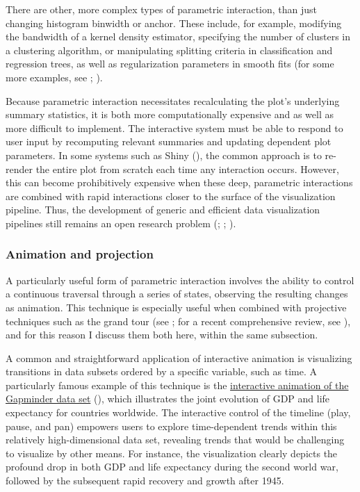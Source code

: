 \documentclass[
]{book}
\theoremstyle{definition}
\theoremstyle{definition}
\theoremstyle{definition}
\theoremstyle{definition}
\theoremstyle{remark}
\begin{document}
There are other, more complex types of parametric interaction, than just changing histogram binwidth or anchor. These include, for example, modifying the bandwidth of a kernel density estimator, specifying the number of clusters in a clustering algorithm, or manipulating splitting criteria in classification and regression trees, as well as regularization parameters in smooth fits (for some more examples, see ; ).

Because parametric interaction necessitates recalculating the plot's underlying summary statistics, it is both more computationally expensive and as well as more difficult to implement. The interactive system must be able to respond to user input by recomputing relevant summaries and updating dependent plot parameters. In some systems such as Shiny (), the common approach is to re-render the entire plot from scratch each time any interaction occurs. However, this can become prohibitively expensive when these deep, parametric interactions are combined with rapid interactions closer to the surface of the visualization pipeline. Thus, the development of generic and efficient data visualization pipelines still remains an open research problem (; ; ).

\subsubsection{Animation and projection}\label{animation-and-projection}

A particularly useful form of parametric interaction involves the ability to control a continuous traversal through a series of states, observing the resulting changes as animation. This technique is especially useful when combined with projective techniques such as the grand tour (see ; for a recent comprehensive review, see ), and for this reason I discuss them both here, within the same subsection.

A common and straightforward application of interactive animation is visualizing transitions in data subsets ordered by a specific variable, such as time. A particularly famous example of this technique is the \href{https://www.gapminder.org/tools/\#$chart-type=bubbles&url=v2}{interactive animation of the Gapminder data set} (), which illustrates the joint evolution of GDP and life expectancy for countries worldwide. The interactive control of the timeline (play, pause, and pan) empowers users to explore time-dependent trends within this relatively high-dimensional data set, revealing trends that would be challenging to visualize by other means. For instance, the visualization clearly depicts the profound drop in both GDP and life expectancy during the second world war, followed by the subsequent rapid recovery and growth after 1945.
\end{document}
